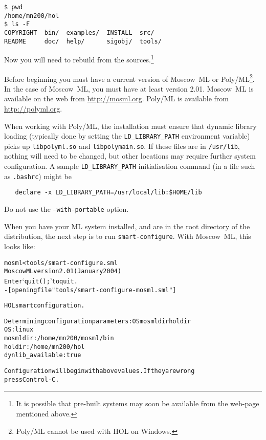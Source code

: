 \setcounter{sessioncount}{0}
\begin{session}
\begin{verbatim}
$ pwd
/home/mn200/hol
$ ls -F
COPYRIGHT  bin/  examples/  INSTALL  src/
README     doc/  help/      sigobj/  tools/
\end{verbatim}
\end{session}

Now you will need to rebuild \HOL{} from the sources.\footnote{It is
  possible that pre-built systems may soon be available from the
  web-page mentioned above.}

Before beginning you must have a current version of Moscow~ML or
Poly/ML\footnote{Poly/ML cannot be used with HOL on Windows.}.
In the case of Moscow~ML, you must have at least version 2.01.
Moscow~ML is available on the web from \url{http://mosml.org}.
Poly/ML is available from \url{http://polyml.org}.

When working with Poly/ML, the installation must ensure that dynamic library loading (typically done by setting the \texttt{LD\_LIBRARY\_PATH} environment variable) picks up \texttt{libpolyml.so} and \texttt{libpolymain.so}.
If these files are in \texttt{/usr/lib}, nothing will need to be changed, but other locations may require further system configuration.
A sample \texttt{LD\_LIBRARY\_PATH} initialisation command (in a file such as \texttt{.bashrc}) might be
\begin{verbatim}
   declare -x LD_LIBRARY_PATH=/usr/local/lib:$HOME/lib
\end{verbatim}
Do not use the \texttt{--with-portable} option.

When you have your ML system installed, and are in the root directory of the distribution, the next step is to run \texttt{smart-configure}.
With Moscow~ML, this looks like:

\begin{session}
\begin{alltt}
\dol mosml < tools/smart-configure.sml
Moscow ML version 2.01 (January 2004)
Enter `quit();' to quit.
- [opening file "tools/smart-configure-mosml.sml"]

HOL smart configuration.

Determining configuration parameters: OS mosmldir holdir
OS:                 linux
mosmldir:           /home/mn200/mosml/bin
holdir:             /home/mn200/hol
dynlib_available:   true

Configuration will begin with above values.  If they are wrong
press Control-C.
\end{alltt}
\end{session}

